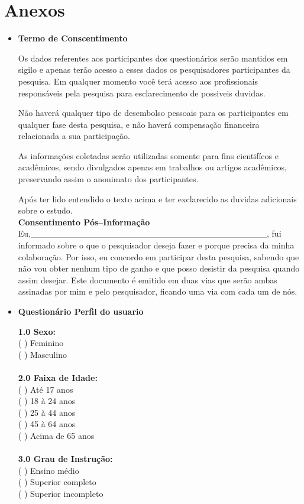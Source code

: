 \chapter*{Anexos}

\begin{itemize}

	\item \textbf{Termo de Conscentimento}

		Os dados referentes aos participantes dos questionários serão mantidos em sigilo e apenas terão acesso a esses dados os pesquisadores participantes da pesquisa.	
		Em qualquer momento você terá acesso aos profissionais responsáveis pela pesquisa para esclarecimento de possiveis duvidas.

		Não haverá qualquer tipo de desembolso pessoais para os participantes em qualquer fase desta pesquisa, e não haverá compensação financeira relacionada a sua participação.

		As informações coletadas serão utilizadas somente para fins cientifícos e acadêmicos, sendo divulgados apenas em trabalhos ou artigos acadêmicos, preservando assim o anonimato dos participantes.
			
		Após ter lido entendido o texto acima e ter exclarecido as duvidas adicionais sobre o estudo. \\


		\textbf{Consentimento Pós–Informação} \\

		Eu,\_\_\_\_\_\_\_\_\_\_\_\_\_\_\_\_\_\_\_\_\_\_\_\_\_\_\_\_\_\_\_\_\_\_\_\_\_\_, fui informado
		sobre o que o pesquisador deseja fazer e porque precisa da minha colaboração.
		 Por isso, eu concordo em participar desta pesquisa, sabendo que não vou obter nenhum tipo de ganho
		e que posso desistir da pesquisa quando assim desejar. Este documento é emitido em duas vias que serão ambas
		assinadas por mim e pelo pesquisador, ficando uma via com cada um de nós.


	\item \textbf{Questionário Perfil do usuario}


		\textbf{1.0 Sexo:}
			\\
			  ( ) Feminino \\
			  ( ) Masculino\\
			\\
		\textbf{2.0 Faixa de Idade:}
			\\
			  ( ) Até 17 anos\\
			  ( ) 18 à 24 anos\\
			  ( ) 25 à 44 anos\\
			  ( ) 45 à 64 anos\\
			  ( ) Acima de 65 anos\\
			\\
		\textbf{3.0 Grau de Instrução:}
			\\
			  ( ) Ensino médio\\
			  ( ) Superior completo\\
			  ( ) Superior incompleto\\
			\\


\end{itemize}
